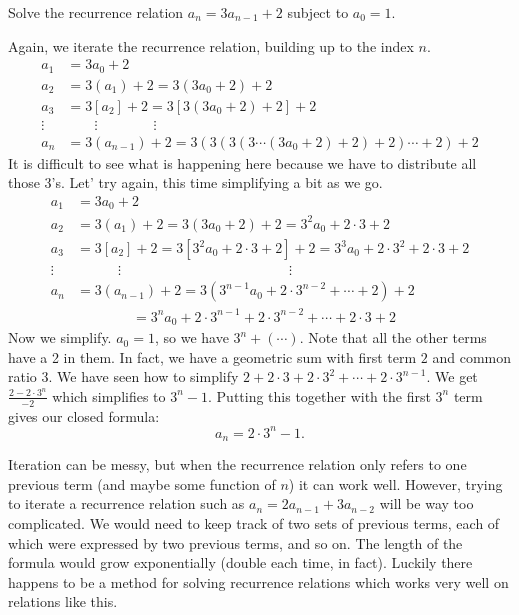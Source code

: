 \documentclass[12pt]{article}
\begin{document}
 \begin{example}
   Solve the recurrence relation $a_n = 3a_{n-1} + 2$ subject to $a_0 = 1$.
   \begin{solution}
     Again, we iterate the recurrence relation, building up to the index $n$.
     \begin{align*}
      a_1 &= 3a_0 + 2\\
      a_2 &= 3(a_1) + 2 = 3(3a_0 + 2) + 2\\
      a_3 &= 3[a_2] + 2 = 3[3(3a_0 + 2) + 2] + 2\\
      \vdots & \qquad \vdots \qquad \qquad \vdots \\
      a_n &= 3(a_{n-1}) + 2 = 3(3(3(3\cdots(3a_0 + 2) + 2) + 2)\cdots + 2)+ 2
     \end{align*}
	 It is difficult to see what is happening here because we have to distribute all those 3's.  Let' try again, this time simplifying a bit as we go.
	      \begin{align*}
      a_1 &= 3a_0 + 2\\
      a_2 &= 3(a_1) + 2 = 3(3a_0 + 2) + 2 = 3^2a_0 + 2\cdot 3 + 2\\
      a_3 &= 3[a_2] + 2 = 3[3^2a_0 + 2\cdot 3 + 2] + 2 = 3^3 a_0 + 2 \cdot 3^2 + 2 \cdot 3 + 2\\
      \vdots & \qquad\quad \vdots \hspace{2in} \vdots \\
      a_n &= 3(a_{n-1}) + 2 = 3(3^{n-1}a_0 + 2 \cdot 3^{n-2} + \cdots +2)+ 2\\
      & \qquad \qquad = 3^n a_0 + 2\cdot 3^{n-1} + 2 \cdot 3^{n-2} + \cdots + 2\cdot 3 + 2
     \end{align*}
    Now we simplify.  $a_0 = 1$, so we have $3^n + (\cdots)$.  Note that all the other terms have a 2 in them.  In fact, we have a geometric sum with first term $2$ and common ratio $3$.  We have seen how to simplify $2 + 2\cdot 3 + 2 \cdot 3^2 + \cdots + 2\cdot 3^{n-1}$.  We get $\frac{2-2\cdot 3^n}{-2}$ which simplifies to $3^n - 1$.  Putting this together with the first $3^n$ term gives our closed formula:
    \[a_n = 2\cdot 3^n - 1.\]
   \end{solution}
 \end{example}


 Iteration can be messy, but when the recurrence relation only refers to one previous term (and maybe some function of $n$) it can work well.  However, trying to iterate a recurrence relation such as $a_n = 2 a_{n-1} + 3 a_{n-2}$ will be way too complicated.  We would need to keep track of two sets of previous terms, each of which were expressed by two previous terms, and so on.  The length of the formula would grow exponentially (double each time, in fact).  Luckily there happens to be a method for solving recurrence relations which works very well on relations like this.
\end{document}
